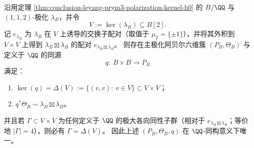 \begin{theorem}\label{thm:conclusion-leyang-prym3-diagonal-gluing-principal-sixfold}
沿用定理 \ref{thm:conclusion-leyang-prym3-polarization-kernel-h0} 的 \(B/\QQ\) 与 \((1,1,2)\)-极化 \(\lambda_B\)，并令
\[
V:=\ker(\lambda_B)\subseteq B[2].
\]
记 \(e_{\lambda_B}\) 为 \(\lambda_B\) 在 \(V\) 上诱导的交换子配对（取值于 \(\mu_2=\{\pm1\}\)），并将其外积到 \(V\times V\) 上得到 \(\lambda_B\boxtimes \lambda_B\) 的配对 \(e_{\lambda_B\boxtimes\lambda_B}\)。
则存在主极化阿贝尔六维簇 \((P_B,\Theta_B)\) 与定义于 \(\QQ\) 的同源
\[
q:\ B\times B\longrightarrow P_B
\]
满足：
\begin{enumerate}
  \item \(\ker(q)=\Delta(V):=\{(v,v):\ v\in V\}\subset V\times V\)；
  \item \(q^{\ast}\Theta_B\sim \lambda_B\boxtimes \lambda_B\)。
\end{enumerate}
并且若 \(\Gamma\subset V\times V\) 为任何定义于 \(\QQ\) 的极大各向同性子群（相对于 \(e_{\lambda_B\boxtimes\lambda_B}\)；等价地 \(|\Gamma|=4\)），则必有 \(\Gamma=\Delta(V)\)。
因此上述 \((P_B,\Theta_B,q)\) 在 \(\QQ\)-同构意义下唯一。
\end{theorem}
